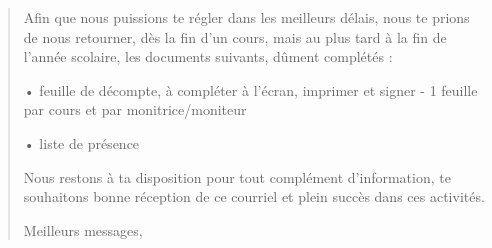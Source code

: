 \documentclass[letterpaper,10pt,english]{sphinxmanual}
\begin{document}
\begin{quote}
\begin{description}
\begin{DUlineblock}{0em}
\item[] 
\item[] Afin que nous puissions te régler dans les meilleurs délais, nous te prions de nous retourner, dès la fin d’un cours, mais au plus tard à la fin de l’année scolaire, les documents suivants, dûment complétés :
\item[] 
\item[] • feuille de décompte, à compléter à l’écran, imprimer et signer - 1 feuille par cours et par monitrice/moniteur
\item[] • liste de présence
\item[] 
\item[] Nous restons à ta disposition pour tout complément d’information, te souhaitons bonne réception de ce courriel et plein succès dans ces activités.
\item[] 
\item[] Meilleurs messages,
\end{DUlineblock}

\end{description}\end{quote}
\end{document}
